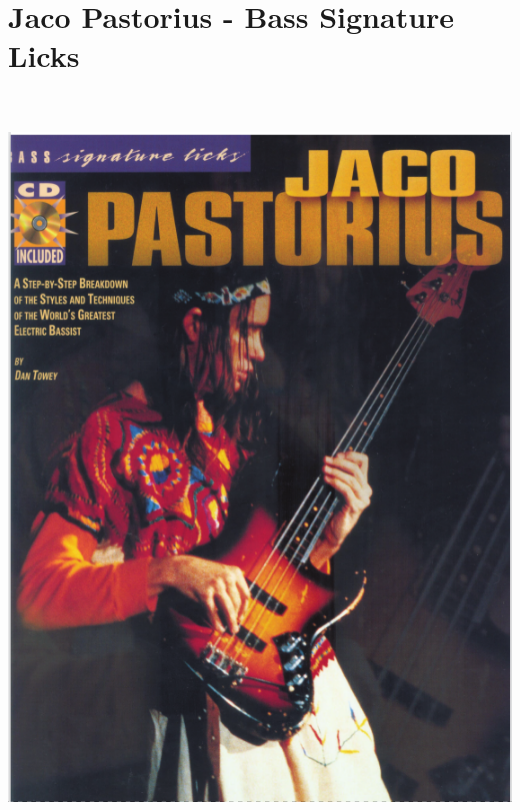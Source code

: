 \documentclass[a4paper]{book}
\begin{document}
\clearpage\section{Jaco Pastorius - Bass Signature Licks}


\begin{center}
\includegraphics[width=14.841cm,height=19.734cm]{lebluessupportsmethodes-img161.png}
\end{center}
\end{document}
